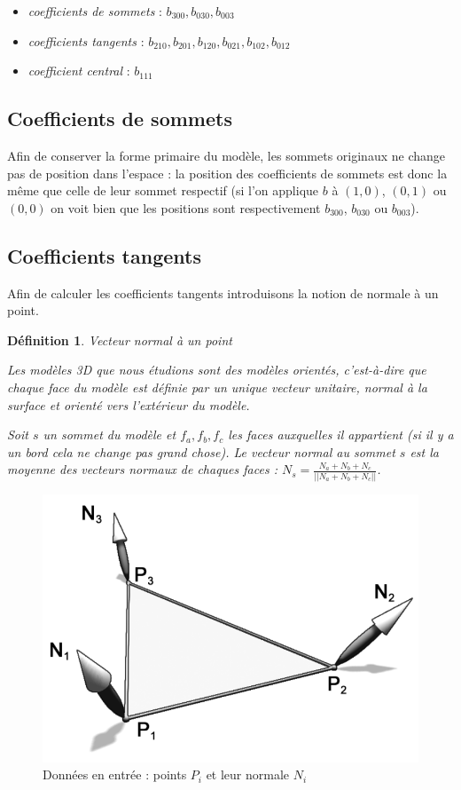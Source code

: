 \documentclass{article}
\newtheorem{definition}{Définition}
\begin{document}
\begin{itemize}
    \item \textit{coefficients de sommets} : $b_{300}, b_{030}, b_{003}$
    \item \textit{coefficients tangents} : $b_{210}, b_{201}, b_{120},
b_{021}, b_{102}, b_{012}$
    \item \textit{coefficient central} : $b_{111}$
\end{itemize}

\subsection{Coefficients de sommets}
Afin de conserver la forme primaire du modèle, les sommets originaux ne change
pas de position dans l'espace : la position des coefficients de sommets est
donc la même que celle de leur sommet respectif (si l'on applique $b$ à
$(1,0)$, $(0,1)$ ou $(0,0)$ on voit bien que les positions sont respectivement
$b_{300}$, $b_{030}$ ou $b_{003}$).

\subsection{Coefficients tangents}
Afin de calculer les coefficients tangents introduisons la notion de normale à
un point.

\begin{definition}{Vecteur normal à un point}

Les modèles 3D que nous étudions sont des modèles orientés, c'est-à-dire que
chaque face du modèle est définie par un unique vecteur unitaire, normal à la
surface et orienté vers l'extérieur du modèle.

Soit $s$ un sommet du modèle et $f_a,f_b,f_c$ les faces auxquelles il
appartient (si il y a un bord cela ne change pas grand chose). Le vecteur
normal au sommet $s$ est la moyenne des vecteurs normaux de chaques faces :
$N_s = \frac{N_a + N_b + N_c}{||N_a + N_b + N_c||}$.
\end{definition}

\begin{figure}[ht!]
\centering
    \includegraphics[width=0.4\linewidth]{normals}
    \caption{Données en entrée : points $P_i$ et leur normale $N_i$}
    \label{fig:normals}
\end{figure}
\end{document}
